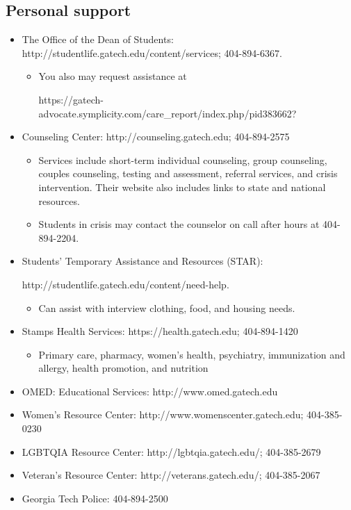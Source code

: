 \documentclass[11pt]{article}
\begin{document}
    \subsection{Personal support}
    \begin{itemize}
        \item The Office of the Dean of Students:  http://studentlife.gatech.edu/content/services; 404-894-6367.
        \begin{itemize}
            \item You also may request assistance at 
           
            https://gatech-advocate.symplicity.com/care\_report/index.php/pid383662?
        \end{itemize}
        \item Counseling Center:  http://counseling.gatech.edu; 404-894-2575
        \begin{itemize}
            \item Services include short-term individual counseling, group counseling, couples counseling, testing and assessment, referral services, and crisis intervention.  Their website also includes links to state and national resources.
            \item Students in crisis may contact the counselor on call after hours at 404-894-2204.
        \end{itemize}
        \item Students’ Temporary Assistance and Resources (STAR):
        
        http://studentlife.gatech.edu/content/need-help.
        \begin{itemize}
            \item Can assist with interview clothing, food, and housing needs.
        \end{itemize}
        \item Stamps Health Services: https://health.gatech.edu; 404-894-1420
        \begin{itemize}
            \item Primary care, pharmacy, women’s health, psychiatry, immunization and allergy, health promotion, and nutrition
        \end{itemize}
        \item OMED: Educational Services:  http://www.omed.gatech.edu
        \item Women’s Resource Center: http://www.womenscenter.gatech.edu; 404-385-0230
        \item LGBTQIA Resource Center: http://lgbtqia.gatech.edu/; 404-385-2679
        \item Veteran’s Resource Center: http://veterans.gatech.edu/; 404-385-2067
        \item Georgia Tech Police: 404-894-2500
    \end{itemize}
\end{document}
